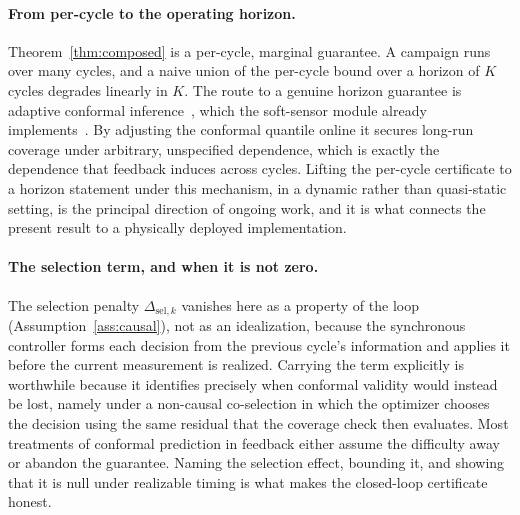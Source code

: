 \documentclass[review,12pt]{elsarticle}
\theoremstyle{definition}
\begin{document}
\paragraph{From per-cycle to the operating horizon.}
Theorem~\ref{thm:composed} is a per-cycle, marginal guarantee. A campaign runs over many
cycles, and a naive union of the per-cycle bound over a horizon of $K$ cycles degrades
linearly in $K$. The route to a genuine horizon guarantee is adaptive conformal
inference~\citep{gibbs2021}, which the soft-sensor module already
implements~\citep{busico_m1}. By adjusting the conformal quantile online it secures
long-run coverage under arbitrary, unspecified dependence, which is exactly the
dependence that feedback induces across cycles. Lifting the per-cycle certificate to a
horizon statement under this mechanism, in a dynamic rather than quasi-static setting, is
the principal direction of ongoing work, and it is what connects the present result to a
physically deployed implementation.

\paragraph{The selection term, and when it is not zero.}
The selection penalty $\Delta_{\mathrm{sel},k}$ vanishes here as a property of the loop
(Assumption~\ref{ass:causal}), not as an idealization, because the synchronous controller
forms each decision from the previous cycle's information and applies it before the
current measurement is realized. Carrying the term explicitly is worthwhile because it
identifies precisely when conformal validity would instead be lost, namely under a
non-causal co-selection in which the optimizer chooses the decision using the same
residual that the coverage check then evaluates. Most treatments of conformal prediction
in feedback either assume the difficulty away or abandon the guarantee. Naming the
selection effect, bounding it, and showing that it is null under realizable timing is what
makes the closed-loop certificate honest.
\end{document}
